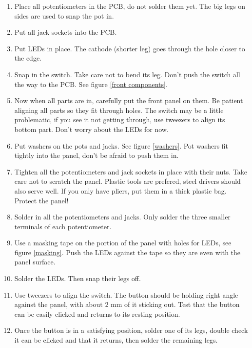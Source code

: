 \documentclass[10pt,a4paper,twocolumn]{article}
\begin{document}
\begin{enumerate}
  \item Place all potentiometers in the PCB, do not solder them yet. The big legs on sides are used to snap the pot in.
  \item Put all jack sockets into the PCB.
  \item Put LEDs in place. The cathode (shorter leg) goes through the hole closer to the edge.
  \item Snap in the switch. Take care not to bend its leg. Don't push the switch all the way to the PCB. See figure \ref{front components}.
  \item Now when all parts are in, carefully put the front panel on them. Be patient aligning all parts so they fit through holes. The switch may be a little problematic, if you see it not getting through, use tweezers to align its bottom part. Don't worry about the LEDs for now.
  \item Put washers on the pots and jacks. See figure \ref{washers}. Pot washers fit tightly into the panel, don't be afraid to push them in.
  \item Tighten all the potentiometers and jack sockets in place with their nuts. Take care not to scratch the panel. Plastic tools are prefered, steel drivers should also serve well. If you only have pliers, put them in a thick plastic bag. Protect the panel!
  \item Solder in all the potentiometers and jacks. Only solder the three smaller terminals of each potentiometer.
  \item Use a masking tape on the portion of the panel with holes for LEDs, see figure \ref{masking}. Push the LEDs against the tape so they are even with the panel surface.
  \item Solder the LEDs. Then snap their legs off.
  \item Use tweezers to align the switch. The button should be holding right angle against the panel, with about 2 mm of it sticking out. Test that the button can be easily clicked and returns to its resting position.
  \item Once the button is in a satisfying position, solder one of its legs, double check it can be clicked and that it returns, then solder the remaining legs.
\end{enumerate}
\end{document}
